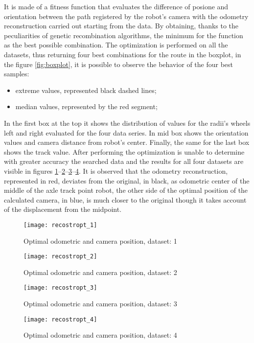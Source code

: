 It is made of a fitness function that evaluates the difference of posione and orientation between the path registered by the robot's camera with the odometry reconstruction carried out starting from the data. By obtaining, thanks to the peculiarities of genetic recombination algorithms, the minimum for the function as the best possible combination.
The optimization is performed on all the datasets, thus returning four best combinations for the route in the boxplot, in the figure \ref{fig:boxplot}, it is possible to observe the behavior of the four best samples:
\begin{itemize}
\item extreme values, represented black dashed lines;
\item median values, represented by the red segment;
\end{itemize}
In the first box at the top it shows the distribution of values for the radii's wheels left and right evaluated for the four data series.
In mid box shows the orientation values and camera distance from robot's center.
Finally, the same for the last box shows the track value.
After performing the optimization is unable to determine with greater accuracy the searched data and the results for all four datasets are visible in figures \ref{fig:OptiOdo1}--\ref{fig:OptiOdo2}--\ref{fig:OptiOdo3}--\ref{fig:OptiOdo4}.
It is observed that the odometry reconstruction, represented in red, deviates from the original, in black, as odometric center of the middle of the axle track point robot, the other side of the optimal position of the calculated camera, in blue, is much closer to the original though it takes account of the displacement from the midpoint.
\begin{figure}[htb]
   {\texttt{[image: recostropt\_1]}}
   \caption{Optimal odometric and camera position, dataset: 1}
   \label{fig:OptiOdo1}
\end{figure}

\begin{figure}[h]
   {\texttt{[image: recostropt\_2]}}
   \caption{Optimal odometric and camera position, dataset: 2}
   \label{fig:OptiOdo2}
\end{figure}

\begin{figure}[h]
   {\texttt{[image: recostropt\_3]}} 
   \caption{Optimal odometric and camera position, dataset: 3}
   \label{fig:OptiOdo3}
\end{figure}

\begin{figure}[h]
   {\texttt{[image: recostropt\_4]}}
\caption{Optimal odometric and camera position, dataset: 4}
\label{fig:OptiOdo4}
\end{figure}
